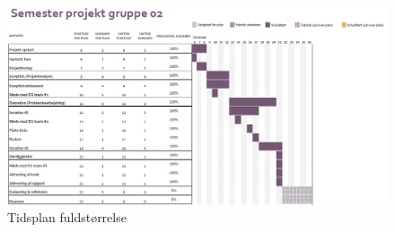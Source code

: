 \begin{landscape}
\begin{figure}
\includegraphics[width = \linewidth]{./PNG/proces/tidsplan.png}
\caption{Tidsplan fuldstørrelse}
\label{fig:tidsplanf}
\end{figure}
\end{landscape}
\newpage